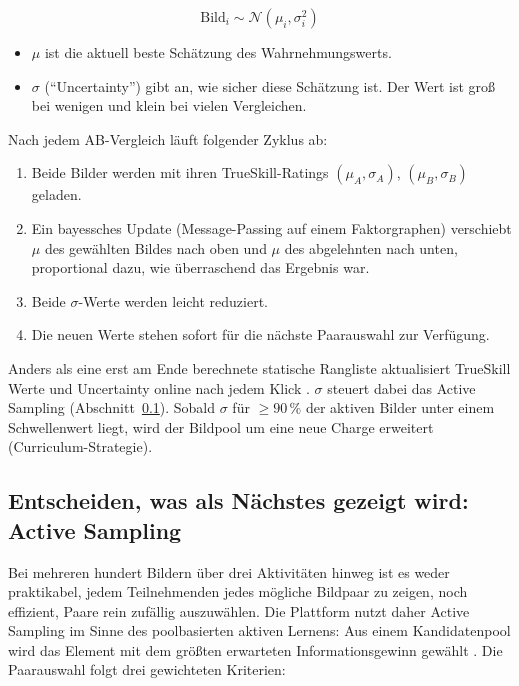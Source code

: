 \documentclass[a4paper,12pt]{article}
\begin{document}
\[
\text{Bild}_i \sim \mathcal{N}(\mu_i, \sigma_i^2)
\]

\begin{itemize}
	\item $\mu$ ist die aktuell beste Schätzung des Wahrnehmungswerts.
	\item $\sigma$ (\enquote{Uncertainty}) gibt an, wie sicher diese Schätzung ist. Der Wert ist groß bei wenigen und klein bei vielen Vergleichen.
\end{itemize}

Nach jedem AB-Vergleich läuft folgender Zyklus ab:

\begin{enumerate}
	\item Beide Bilder werden mit ihren TrueSkill-Ratings $(\mu_A,\sigma_A)$, $(\mu_B,\sigma_B)$ geladen.
	\item Ein bayessches Update (Message-Passing auf einem Faktorgraphen) verschiebt $\mu$ des gewählten Bildes nach oben und $\mu$ des abgelehnten nach unten, proportional dazu, wie überraschend das Ergebnis war.
	\item Beide $\sigma$-Werte werden leicht reduziert.
	\item Die neuen Werte stehen sofort für die nächste Paarauswahl zur Verfügung.
\end{enumerate}

Anders als eine erst am Ende berechnete statische Rangliste aktualisiert TrueSkill Werte und Uncertainty online nach jedem Klick \autocite{herbrich2007}. $\sigma$ steuert dabei das Active Sampling (Abschnitt~\ref{sec:active-sampling}). Sobald $\sigma$ für $\geq 90\,\%$ der aktiven Bilder unter einem Schwellenwert liegt, wird der Bildpool um eine neue Charge erweitert (Curriculum-Strategie).

\subsection{Entscheiden, was als Nächstes gezeigt wird: Active Sampling}
\label{sec:active-sampling}

Bei mehreren hundert Bildern über drei Aktivitäten hinweg ist es weder praktikabel, jedem Teilnehmenden jedes mögliche Bildpaar zu zeigen, noch effizient, Paare rein zufällig auszuwählen. Die Plattform nutzt daher Active Sampling im Sinne des poolbasierten aktiven Lernens: Aus einem Kandidatenpool wird das Element mit dem größten erwarteten Informationsgewinn gewählt \autocite{settles2009}. Die Paarauswahl folgt drei gewichteten Kriterien:
\end{document}
